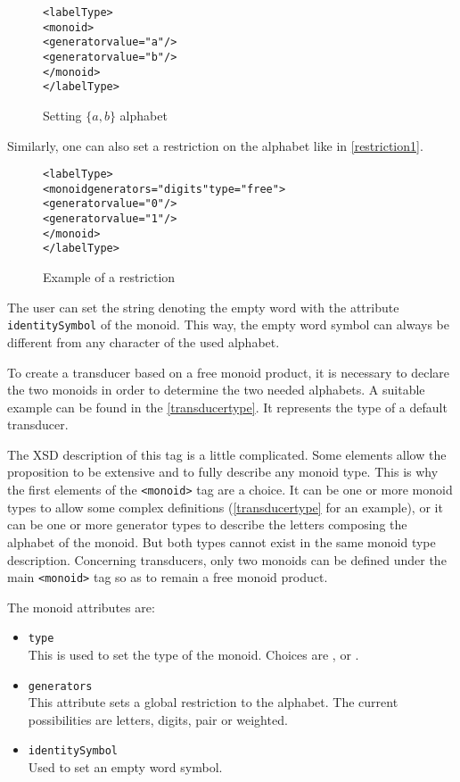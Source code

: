 \documentclass[a4paper]{article}
\newcommand{\xtag}[1]{\texttt{<#1>}}
\newcommand{\xattr}[1]{\texttt{#1}}
\begin{document}
\begin{figure}[ht]
  \small
  \begin{center}
\begin{alltt}
<labelType>
  <monoid>
     <generator value="a"/>
     <generator value="b"/>
  </monoid>
</labelType>
\end{alltt}

\caption{Setting $\{a, b\}$ alphabet}
\label{alpha1}
  \end{center}
\end{figure}

Similarly, one can also set a restriction on the alphabet like in
\autoref{restriction1}.

\begin{figure}[ht]
  \small
  \begin{center}
\begin{alltt}
<labelType>
  <monoid generators="digits" type="free">
    <generator value="0"/>
    <generator value="1"/>
  </monoid>
</labelType>
\end{alltt}

\caption{Example of a restriction}
\label{restriction1}
  \end{center}
\end{figure}


The user can set the string denoting the empty word with the attribute
\xattr{identitySymbol} of the monoid. This way, the empty word
symbol can always be different from any character of the used
alphabet.

To create a transducer based on a free monoid product, it is necessary
to declare the two monoids in order to determine the two needed
alphabets. A suitable example can be found in the
\autoref{transducertype}. It represents the type of a default
transducer.

The XSD description of this tag is a little complicated. Some elements
allow the proposition to be extensive and to fully describe any monoid
type. This is why the first elements of the \xtag{monoid} tag are a
choice. It can be one or more monoid types to allow some complex
definitions (\autoref{transducertype} for an example), or it can
be one or more generator types to describe the letters composing the
alphabet of the monoid. But both types cannot exist in the same monoid
type description. Concerning transducers, only two monoids can be
defined under the main \xtag{monoid} tag so as to remain a free monoid
product.

The monoid attributes are:
\begin{itemize}
\item \xattr{type}\\
  This is used to set the type of the monoid. Choices are ,
   or .
\item \xattr{generators}\\
  This attribute sets a global restriction to the alphabet. The
  current possibilities are letters, digits, pair or weighted.
\item \xattr{identitySymbol}\\
  Used to set an empty word symbol.
\end{itemize}
\end{document}
